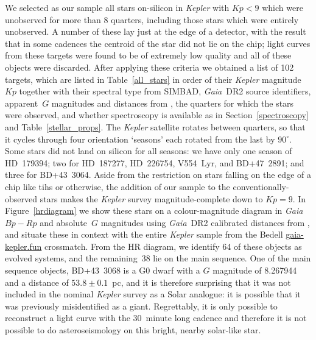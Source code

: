 \documentclass[a4paper,fleqn,usenatbib]{mnras}
\newcommand{\kepler}{\emph{Kepler}\xspace}
\newcommand{\gaia}{\emph{Gaia}\xspace}
\begin{document}
We selected as our sample all stars on-silicon in \kepler with $Kp<9$ which were unobserved for more than $8$ quarters, including those stars which were entirely unobserved. A number of these lay just at the edge of a detector, with the result that in some cadences the centroid of the star did not lie on the chip; light curves from these targets were found to be of extremely low quality and all of these objects were discarded. After applying these criteria we obtained a list of 102 targets, which are listed in Table~\ref{all_stars} in order of their \kepler magnitude $Kp$ together with their spectral type from SIMBAD, \gaia~DR2 source identifiers, apparent~$G$ magnitudes and distances from \citet{gaiadists}, the quarters for which the stars were observed, and whether spectroscopy is available as in Section~\ref{spectroscopy} and Table~\ref{stellar_props}. The \kepler satellite rotates between quarters, so that it cycles through four orientation `seasons' each rotated from the last by $90^{\circ}$. Some stars did not land on silicon for all seasons: we have only one season of HD~179394; two for HD~187277, HD~226754, V554~Lyr, and BD+47~2891; and three for BD+43~3064. Aside from the restriction on stars falling on the edge of a chip like tihs or otherwise, the addition of our sample to the conventionally-observed stars makes the \kepler survey magnitude-complete down to $Kp=9$. In Figure~\ref{hrdiagram} we show these stars on a colour-magnitude diagram in \gaia $Bp-Rp$ and absolute~$G$ magnitudes using \gaia~DR2 calibrated distances from \citet{gaiadists}, and situate these in context with the entire \kepler sample from the Bedell \url{gaia-kepler.fun} crossmatch. From the HR diagram, we identify 64 of these objects as evolved systems, and the remaining~38 lie on the main sequence. One of the main sequence objects, BD+43~3068 is a G0 dwarf with a $G$ magnitude of 8.267944 and a distance of $53.8 \pm 0.1$~pc, and it is therefore surprising that it was not included in the nominal \kepler survey as a Solar analogue: it is possible that it was previously misidentified as a giant. Regrettably, it is only possible to reconstruct a light curve with the 30~minute long cadence and therefore it is not possible to do asteroseismology on this bright, nearby solar-like star. 
\end{document}

